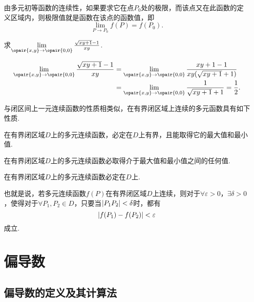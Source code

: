 由多元初等函数的连续性，如果要求它在点\(P_0\)处的极限，而该点又在此函数的定义区域内，则极限值就是函数在该点的函数值，即\[
\lim\limits_{P \to P_0} f(P) = f(P_0).
\]

\begin{example}
\def\l{\lim\limits_{\opair{x,y}\to\opair{0,0}}}
求\(\l \frac{\sqrt{xy+1}-1}{xy}\).
\begin{solution}
\[\begin{split}
\l \frac{\sqrt{xy+1}-1}{xy}
&= \l \frac{xy+1-1}{xy(\sqrt{xy+1}+1)} \\
&= \l \frac{1}{\sqrt{xy+1}+1}
= \frac{1}{2}.
\end{split}\]
\end{solution}
\end{example}

与闭区间上一元连续函数的性质相类似，在有界闭区域上连续的多元函数具有如下性质.

\begin{property}[有界性与最值定理]\label{theorem:多元函数微分法.有界性与最值定理}
在有界闭区域\(D\)上的多元连续函数，必定在\(D\)上有界，且能取得它的最大值和最小值.
\end{property}

\begin{property}[介值定理]\label{theorem:多元函数微分法.介值定理}
在有界闭区域\(D\)上的多元连续函数必取得介于最大值和最小值之间的任何值.
\end{property}

\begin{property}[一致连续性定理]\label{theorem:多元函数微分法.一致连续性定理}
在有界闭区域\(D\)上的多元连续函数必定在\(D\)上.

也就是说，若多元连续函数\(f(P)\)在有界闭区域\(D\)上连续，则对于\(\forall \varepsilon > 0\)，\(\exists \delta > 0\)，使得对于\(\forall P_1,P_2 \in D\)，只要当\(\abs{P_1P_2}<\delta\)时，都有\[
\abs{f(P_1)-f(P_2)} < \varepsilon
\]成立.
\end{property}

\section{偏导数}
\subsection{偏导数的定义及其计算法}
